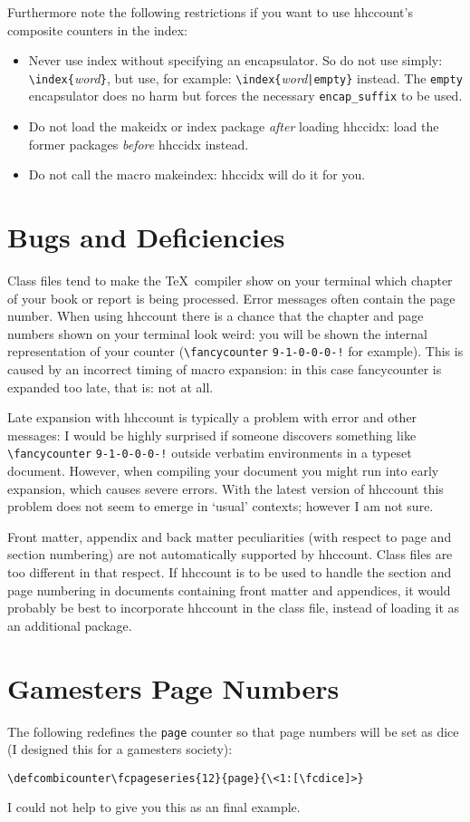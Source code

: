 \documentclass[11pt]{article}
\makeatletter
\def\packagename#1{{\sffamily #1}}     %
\def\macroname#1{{\ttfamily\@ttbs#1}}  %
\def\hhccount{\packagename{hhccount}\xspace}
\def\hhccidx{\packagename{hhccidx}\xspace}
\def\={\verb=}
\def\<#1>{\macroname{#1}}
\makeatother
\begin{document}
Furthermore note the following restrictions if you want to
use \hhccount's composite counters in the index:\begin{itemize}
\item Never use \<index> without specifying an encapsulator.
      So do not use simply: \=\index{=\textit{word}\=}=, but
      use, for example: \=\index{=\textit{word}\=|empty}= instead.
      The \texttt{empty} encapsulator does no harm but forces
      the necessary \=encap_suffix= to be used.
\item Do not load the \packagename{makeidx} or \packagename{index}
      package \textit{after} loading \hhccidx: load the former packages
      \textit{before} \hhccidx instead.
\item Do not call the macro \<makeindex>: \hhccidx will do it for you.
\end{itemize}

\section{Bugs and Deficiencies}

Class files tend to make the \TeX\ compiler show on your terminal
which chapter of your book or report is being processed. Error messages
often contain the page number. When using \hhccount
there is a chance that the chapter and page numbers shown on your
terminal look weird: you will be shown the internal representation
of your counter (\=\fancycounter= \=9-1-0-0-0-!= for example). This is
caused by an incorrect timing of macro expansion: in this case
\<fancycounter> is expanded too late, that is: not at all.

Late expansion with \hhccount is typically a problem with
error and other messages: I would be highly surprised if someone
discovers something like \=\fancycounter= \=9-1-0-0-0-!= outside
verbatim environments in a typeset document. However, when compiling your
document you might run into early expansion, which causes severe errors.
With the latest version of \hhccount this problem does not seem to
emerge in `usual' contexts; however I am not sure.

Front matter, appendix and back matter peculiarities (with respect
to page and section numbering) are not automatically supported
by \hhccount. Class
files are too different in that respect. If \hhccount is to be used
to handle the section and page numbering in documents containing
front matter and appendices, it would probably be best to incorporate
\hhccount in the class file, instead of loading it as an additional
package.

\section{Gamesters Page Numbers}

The following redefines the {\tt page} counter so that page numbers
will be set as dice (I designed this for a gamesters society):

\begin{verbatim}
\defcombicounter\fcpageseries{12}{page}{\<1:[\fcdice]>}
\end{verbatim}

I could not help to give you this as an final example.
\end{document}
